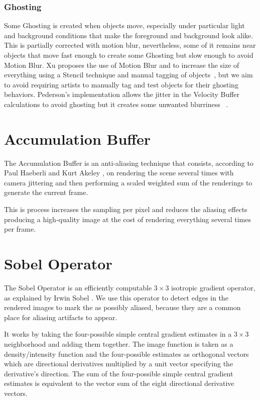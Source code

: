 \documentclass{cslthse-msc}
\begin{document}
\subsubsection{Ghosting} 
Some Ghosting is created when objects move, especially under particular light and background conditions that make the foreground and background look alike. This is partially corrected with motion blur, nevertheless, some of it remains near objects that move fast enough to create some Ghosting but slow enough to avoid Motion Blur. Xu proposes the use of Motion Blur and to increase the size of everything using a Stencil technique and manual tagging of objects~\cite{XU2016}, but we aim to avoid requiring artists to manually tag and test objects for their ghosting behaviors. Pederson's implementation allows the jitter in the Velocity Buffer calculations to avoid ghosting but it creates some unwanted blurriness ~\cite{Fuglsand2016}.  

\section{Accumulation Buffer}
The Accumulation Buffer is an anti-aliasing technique that consists, according to Paul Haeberli and Kurt Akeley \cite{Haeberli1990}, on rendering the scene several times with camera jittering and then performing a scaled weighted sum of the renderings to generate the current frame.

This is process increases the sampling per pixel and reduces the aliasing effects producing a high-quality image at the cost of rendering everything several times per frame.

\section{Sobel Operator}
The Sobel Operator is an efficiently computable $3\times 3$ isotropic gradient operator, as explained by Irwin Sobel \cite{Sobel2014}. We use this operator to detect edges in the rendered images to mark the as possibly aliased, because they are a common place for aliasing artifacts to appear.

It works by taking the four-possible simple central gradient estimates in a $3\times 3$ neighborhood and adding them together. The image function is taken as a density/intensity function and the four-possible estimates as orthogonal vectors which are directional derivatives multiplied by a unit vector specifying the derivative’s direction.  The sum of the four-possible simple central gradient estimates is equivalent to the vector sum of the eight directional derivative vectors.
\end{document}

